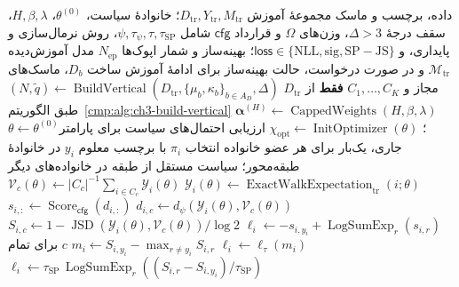 \begin{algorithm}[!htbp]
\caption{آموزش سیاست انتخاب ویژگی با گشت دقیق و مراکز وابسته به سیاست}
\label{cmp:alg:ch3-learn-feature-policy}
\begin{algorithmic}[1]
\REQUIRE داده، برچسب و ماسک مجموعهٔ آموزش
$D_{\mathrm{tr}},Y_{\mathrm{tr}},M_{\mathrm{tr}}$؛
خانوادهٔ سیاست، $\theta^{(0)}$، $H,\beta,\lambda$،
سقف درجهٔ $\Delta>3$، وزن‌های $\Omega$ و قرارداد $\mathsf{cfg}$
شامل $\psi,\tau_\psi,\tau,\tau_{\mathrm{SP}}$،
روش نرمال‌سازی و پایداری،
و $\mathsf{loss}\in\{\mathrm{NLL},\mathrm{sig},
\mathrm{SP\!-\!JS}\}$؛ بهینه‌ساز و شمار اپوک‌ها $N_{\mathrm{ep}}$
\ENSURE مدل آموزش‌دیده
$\mathcal M_{\mathrm{tr}}$ و در صورت درخواست،
حالت بهینه‌ساز برای ادامهٔ آموزش
\STATE ساخت $D_b$، ماسک‌های مجاز و
$C_1,\ldots,C_K$ \textbf{فقط} از $D_{\mathrm{tr}}$
\STATE $(N,\widetilde q)
\gets\operatorname{BuildVertical}
(D_{\mathrm{tr}},\{\mu_b,\kappa_b\}_{b\in A_D},\Delta)$
طبق الگوریتم~\ref{cmp:alg:ch3-build-vertical}
\STATE $\boldsymbol\alpha^{(H)}\gets
\operatorname{CappedWeights}(H,\beta,\lambda)$
\STATE $\theta\gets\theta^{(0)}$؛
$\chi_{\mathrm{opt}}\gets\operatorname{InitOptimizer}(\theta)$
    \STATE ارزیابی احتمال‌های سیاست برای پارامتر جاری،
    یک‌بار برای هر عضو خانواده
        \STATE انتخاب $\pi_i$ با برچسب معلوم $y_i$
        در خانوادهٔ طبقه‌محور؛ سیاست مستقل از طبقه
        در خانواده‌های دیگر
        \STATE $\mathscr Y_i(\theta)\gets
        \operatorname{ExactWalkExpectation}_{\mathrm{tr}}(i;\theta)$
    \ENDFOR
        \STATE $\mathcal V_c(\theta)\gets
        |C_c|^{-1}\sum_{i\in C_c}\mathscr Y_i(\theta)$
    \ENDFOR
            \STATE $d_{i,c}\gets
            d_\psi(\mathscr Y_i(\theta),\mathcal V_c(\theta))$
        \ENDFOR
            \STATE $s_{i,:}\gets
            \operatorname{Score}_{\mathsf{cfg}}(d_{i,:})$
            \STATE $\ell_i\gets
            -s_{i,y_i}+\operatorname{LogSumExp}_r(s_{i,r})$
        \ELSE
            \STATE $S_{i,c}\gets 1-
            \operatorname{JSD}(\mathscr Y_i(\theta),\mathcal V_c(\theta))/\log2$
            برای تمام $c$
                \STATE $m_i\gets S_{i,y_i}-\max_{r\ne y_i}S_{i,r}$
                \STATE $\ell_i\gets \ell_\tau(m_i)$
            \ELSE
                \STATE $\ell_i\gets\tau_{\mathrm{SP}}\,
                \operatorname{LogSumExp}_r
                ((S_{i,r}-S_{i,y_i})/\tau_{\mathrm{SP}})$

\end{algorithmic}
\end{algorithm}
